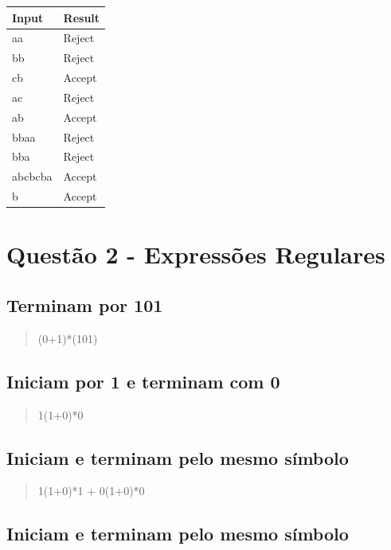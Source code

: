 \documentclass[11pt]{article}
\begin{document}
\begin{center}
\begin{tabular}{ll}
Input & Result\\
\hline
aa & Reject\\
bb & Reject\\
cb & Accept\\
ac & Reject\\
ab & Accept\\
bbaa & Reject\\
bba & Reject\\
abcbcba & Accept\\
b & Accept\\
\end{tabular}
\end{center}
\section{Questão 2 - Expressões Regulares}
\label{sec:org0d09579}

\subsection{Terminam por 101}
\label{sec:org9d0845b}

\begin{quote}
(0+1)*(101)
\end{quote}

\subsection{Iniciam por 1 e terminam com 0}
\label{sec:org0316c1e}

\begin{quote}
1(1+0)*0 
\end{quote}

\subsection{Iniciam e terminam pelo mesmo símbolo}
\label{sec:orga1c313a}

\begin{quote}
1(1+0)*1 + 0(1+0)*0 
\end{quote}

\subsection{Iniciam e terminam pelo mesmo símbolo}
\label{sec:orgc6de373}
\end{document}
